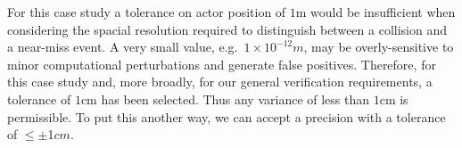 \documentclass[letterpaper, 10 pt, journal, twoside]{IEEEtran}
\begin{document}
%
% 

%
For this case study a tolerance on actor position of $1$m would be insufficient when considering the spacial resolution required to distinguish between a collision and a near-miss event. 
A very small value, e.g.\ $1\times10^{-12}m$, may be overly-sensitive to minor computational perturbations and generate false positives. 
Therefore, for this case study and, more broadly, for our general verification requirements, a tolerance of $1$cm has been selected. 
Thus any variance of less than $1$cm is permissible. To put this another way, we can accept a precision with a tolerance of $\leq$$\pm$1$cm$. 


%


\end{document}

